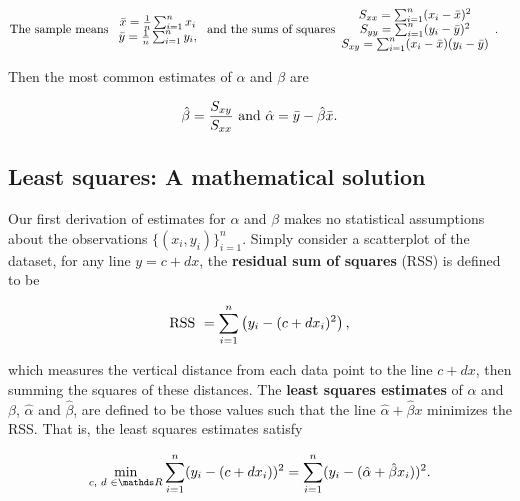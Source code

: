 \documentclass{homework}
\begin{document}
\begin{align}
    \textnormal{The sample means } \begin{array}{c}
        \bar{x} = \frac{1}{n} \sum_{i=1}^{n} x_i    \\
        \bar{y} = \frac{1}{n} \sum_{i=1}^{n} y_i,   
    \end{array} & \textnormal{ and the sums of squares} \begin{array}{c}
       S_{xx} = \sum_{i=1}^{n} (x_i - \bar{x})^2  \\
       S_{yy} = \sum_{i=1}^{n} (y_i - \bar{y})^2   \\
       S_{xy} = \sum_{i=1}^{n} (x_i - \bar{x})(y_i - \bar{y})
    \end{array}.
\end{align}

Then the most common estimates of $\alpha$ and $\beta$ are 

\begin{align*}
    \hat{\beta} = \frac{S_{xy}}{S_{xx}} \textnormal{ and } \hat{\alpha} = \bar{y} - \hat{\beta} \bar{x}.
\end{align*}

\subsection{Least squares: A mathematical solution}

Our first derivation of estimates for $\alpha$ and $\beta$ makes no statistical assumptions about the observations  $\{(x_i, y_i)\}_{i=1}^n$. Simply consider a scatterplot of the dataset, for any line $y=c+dx$, the \textbf{residual sum of squares} (RSS) is defined to be 

\begin{equation}
    \textnormal{RSS } = \sum_{i=1}^{n} \left(y_i - (c+dx_i)^2\right), 
\end{equation}

which measures the vertical distance from each data point to the line $c+dx$, then summing the squares of these distances. The \textbf{least squares estimates} of $\alpha$ and $\beta$, 
$\hat{\alpha}$ and $\hat{\beta}$, are defined to be those values such that the line $\hat{\alpha} + \hat{\beta} x$ minimizes the RSS. That is, the least squares estimates satisfy

\begin{equation}
    \min_{c, \blank d \blank \in \R} \sum_{i=1}^{n} (y_i - (c+dx_i))^2 = \sum_{i=1}^{n} (y_i - (\hat{\alpha}+\hat{\beta}x_i))^2.
\end{equation}
\end{document}
